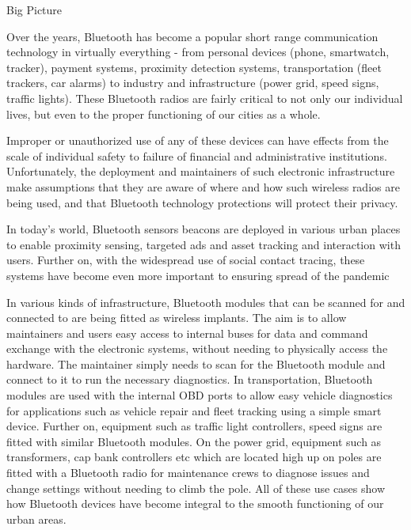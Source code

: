 \begin{dissertationintroduction}
    Big Picture

    Over the years, Bluetooth has become a popular short range communication technology in virtually everything - from personal devices (phone, smartwatch, tracker), payment systems, proximity detection systems, transportation (fleet trackers, car alarms) to industry and infrastructure (power grid, speed signs, traffic lights). These Bluetooth radios are fairly critical to not only our individual lives, but even to the proper functioning of our cities as a whole. 
    
    Improper or unauthorized use of any of these devices can have effects from the scale of individual safety to failure of financial and administrative institutions. Unfortunately, the deployment and maintainers of such electronic infrastructure make assumptions that they are aware of where and how such wireless radios are being used, and that Bluetooth technology protections will protect their privacy.
    
    In today’s world, Bluetooth sensors beacons are deployed in various urban places to enable proximity sensing, targeted ads and asset tracking and interaction with users. Further on, with the widespread use of social contact tracing, these systems have become even more important to ensuring spread of the pandemic
    
    In various kinds of infrastructure, Bluetooth modules that can be scanned for and connected to are being fitted as wireless implants. The aim is to allow maintainers and users easy access to internal buses for data and command exchange with the electronic systems, without needing to physically access the hardware. The maintainer simply needs to scan for the Bluetooth module and connect to it to run the necessary diagnostics. In transportation, Bluetooth modules are used with the internal OBD ports to allow easy vehicle diagnostics for applications such as vehicle repair and fleet tracking using a simple smart device. Further on, equipment such as traffic light controllers, speed signs are fitted with similar Bluetooth modules. On the power grid, equipment such as transformers, cap bank controllers etc which are located high up on poles are fitted with a Bluetooth radio for maintenance crews to diagnose issues and change settings without needing to climb the pole. All of these use cases show how Bluetooth devices have become integral to the smooth functioning of our urban areas.
    

\end{dissertationintroduction}

